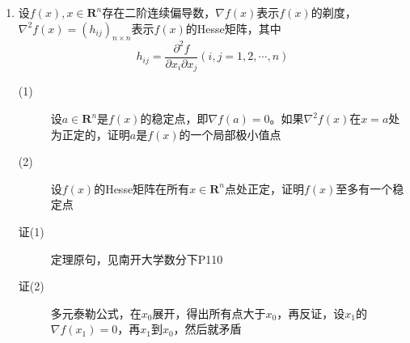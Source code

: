 \begin{enumerate}
\item 设$f(x),x\in \mathbf{R}^n$存在二阶连续偏导数，$\nabla f(x)$表示$f(x)$的剃度，$\nabla^2 f(x)=(h_{ij})_{n\times n}$表示$f(x)$的Hesse矩阵，其中
\[
h_{ij}=\frac{\partial^2 f}{\partial x_i \partial x_j}(i,j=1,2,\cdots,n)
\]
\begin{description}
\item[(1)] 设$a\in \mathbf{R}^n$是$f(x)$的稳定点，即$\nabla f(a)=0$。如果$\nabla^2 f(x)$在$x=a$处为正定的，证明$a$是$f(x)$的一个局部极小值点
\item[(2)] 设$f(x)$的Hesse矩阵在所有$x\in\mathbf{R}^n$点处正定，证明$f(x)$至多有一个稳定点
\item[证(1)] 定理原句，见南开大学数分下P110
\item[证(2)] 多元泰勒公式，在$x_0$展开，得出所有点大于$x_0$，再反证，设$x_1$的$\nabla f(x_1)=0$，再$x_1$到$x_0$，然后就矛盾
\end{description}





















\end{enumerate}